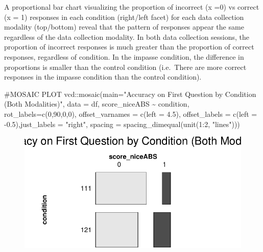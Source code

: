 \documentclass[
  letterpaper,
  DIV=11,
  numbers=noendperiod]{scrreprt}
\newenvironment{Shaded}{\begin{snugshade}}{\end{snugshade}}
\newcommand{\AttributeTok}[1]{\textcolor[rgb]{0.40,0.45,0.13}{#1}}
\newcommand{\CommentTok}[1]{\textcolor[rgb]{0.37,0.37,0.37}{#1}}
\newcommand{\DecValTok}[1]{\textcolor[rgb]{0.68,0.00,0.00}{#1}}
\newcommand{\FloatTok}[1]{\textcolor[rgb]{0.68,0.00,0.00}{#1}}
\newcommand{\FunctionTok}[1]{\textcolor[rgb]{0.28,0.35,0.67}{#1}}
\newcommand{\NormalTok}[1]{\textcolor[rgb]{0.00,0.23,0.31}{#1}}
\newcommand{\SpecialCharTok}[1]{\textcolor[rgb]{0.37,0.37,0.37}{#1}}
\newcommand{\StringTok}[1]{\textcolor[rgb]{0.13,0.47,0.30}{#1}}
\begin{document}
A proportional bar chart visualizing the proportion of incorrect (x =0)
vs correct (x = 1) responses in each condition (right/left facet) for
each data collection modality (top/bottom) reveal that the pattern of
responses appear the same regardless of the data collection modality. In
both data collection sessions, the proportion of incorrect responses is
much greater than the proportion of correct responses, regardless of
condition. In the impasse condition, the difference in proportions is
smaller than the control condition (i.e.~There are more correct
responses in the impasse condition than the control condition).

\begin{Shaded}
\begin{Highlighting}[]
\CommentTok{\#MOSAIC PLOT}
\NormalTok{vcd}\SpecialCharTok{::}\FunctionTok{mosaic}\NormalTok{(}\AttributeTok{main=}\StringTok{"Accuracy on First Question by Condition (Both Modalities)"}\NormalTok{,}
            \AttributeTok{data =}\NormalTok{ df, score\_niceABS }\SpecialCharTok{\textasciitilde{}}\NormalTok{ condition, }\AttributeTok{rot\_labels=}\FunctionTok{c}\NormalTok{(}\DecValTok{0}\NormalTok{,}\DecValTok{90}\NormalTok{,}\DecValTok{0}\NormalTok{,}\DecValTok{0}\NormalTok{),}
            \AttributeTok{offset\_varnames =} \FunctionTok{c}\NormalTok{(}\AttributeTok{left =} \FloatTok{4.5}\NormalTok{), }\AttributeTok{offset\_labels =} \FunctionTok{c}\NormalTok{(}\AttributeTok{left =} \SpecialCharTok{{-}}\FloatTok{0.5}\NormalTok{),}\AttributeTok{just\_labels =} \StringTok{"right"}\NormalTok{,}
            \AttributeTok{spacing =} \FunctionTok{spacing\_dimequal}\NormalTok{(}\FunctionTok{unit}\NormalTok{(}\DecValTok{1}\SpecialCharTok{:}\DecValTok{2}\NormalTok{, }\StringTok{"lines"}\NormalTok{)))}
\end{Highlighting}
\end{Shaded}

\begin{figure}[H]

{\centering \includegraphics{analysis/SGC3A/4_sgc3A_hypotesting_files/figure-pdf/VIS-Q1ACC.by.COND-mosaic-1.pdf}

}

\end{figure}
\end{document}
